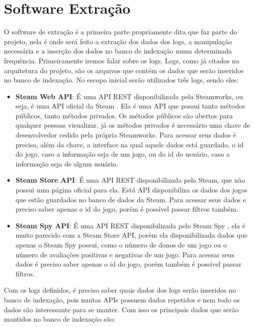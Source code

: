 \section{Software Extração}
O software de extração é a primeira parte propriamente dita que faz parte do projeto, nela é onde será feito a extração dos dados dos logs, a manipulação necessária e a inserção dos dados no banco de indexação numa determinada frequência. Primeiramente iremos falar sobre os logs. Logs, como já citados na arquitetura do projeto, são os arquivos que contém os dados que serão inseridos no banco de indexação. No escopo inicial serão utilizados três logs, sendo eles:
\begin{itemize}
	\item \textbf{Steam Web API}: É uma API REST disponibilizada pela Steamworks, ou seja, é uma API oficial da Steam \cite{steam_api}. Ela é uma API que possui tanto métodos públicos, tanto métodos privados. Os métodos públicos são abertos para qualquer pessoas visualizar, já os métodos privados é necessário uma chave de desenvolvedor cedido pela própria Steamworks. Para acessar seus dados é preciso, além da chave, a interface na qual aquele dados está guardado, o id do jogo, caso a informação seja de um jogo, ou do id do usuário, caso a informação seja de algum usuário.
	\item \textbf{Steam Store API}: É uma API REST disponibilizada pela Steam, que não possui uma página oficial para ela. Está API disponibiliza os dados dos jogos que estão guardados no banco de dados da Steam. Para acessar seus dados e preciso saber apenas o id do jogo, porém é possível passar filtros também.
	\item \textbf{Steam Spy API}: É uma API REST disponibilizada pelo Steam Spy \cite{steam_spy}, ela é muito parecido com a Steam Store API, porém ela disponibilizada dados que apenas o Steam Spy possui, como o número de donos de um jogo ou o número de avaliações positivas e negativas de um jogo. Para acessar seus dados é preciso saber apenas o id do jogo, porém também é possível passar filtros.
\end{itemize}
Com os logs definidos, é preciso saber quais dados dos logs serão inseridos no banco de indexação, pois muitas APIs possuem dados repetidos e nem todo os dados são interessante para se manter. Com isso os principais dados que serão mantidos no banco de indexação são:
